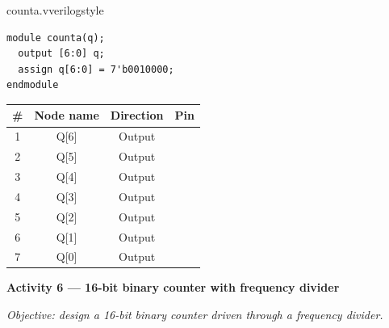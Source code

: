 \begin{procedure}
  \begin{codepanel}{counta.v}{verilogstyle}
    \begin{lstlisting}
module counta(q);
  output [6:0] q;
  assign q[6:0] = 7'b0010000;
endmodule
\end{lstlisting}
  \end{codepanel}
  \vspace{-4pt}

  \needspace{4cm}
  \begin{boxedtable}
    \label{tab:exp3-pins}
    {\renewcommand{\arraystretch}{1.5}
      \centering
      \begin{tabular}{cccc}
        \toprule
        \# & Node name & Direction & Pin \\
        \midrule
        1  & Q[6]      & Output    &     \\
        2  & Q[5]      & Output    &     \\
        3  & Q[4]      & Output    &     \\
        4  & Q[3]      & Output    &     \\
        5  & Q[2]      & Output    &     \\
        6  & Q[1]      & Output    &     \\
        7  & Q[0]      & Output    &     \\
        \bottomrule
      \end{tabular}
    }
  \end{boxedtable}
  \newpage

  \textbf{Activity 6 --- 16-bit binary counter with frequency divider}\vspace{2pt}

  \textit{Objective: design a 16-bit binary counter driven through a frequency divider.}


\end{procedure}

